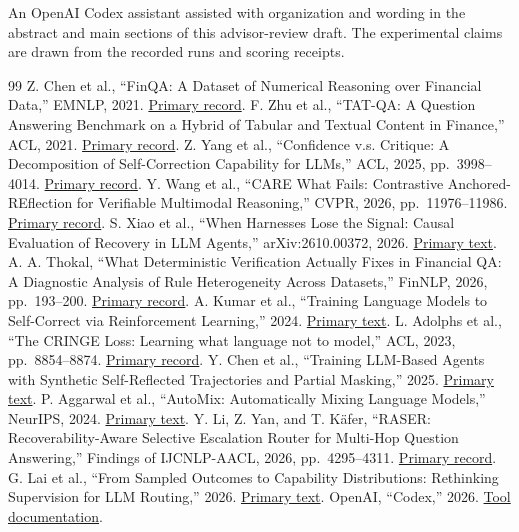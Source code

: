 \documentclass[10pt,letterpaper,conference]{IEEEtran}
\begin{document}
An OpenAI Codex assistant \cite{r13} assisted with organization and wording in the abstract and main sections of this advisor-review draft. The experimental claims are drawn from the recorded runs and scoring receipts.
\begin{thebibliography}{99}
 Z. Chen et al., ``FinQA: A Dataset of Numerical Reasoning over Financial Data,'' EMNLP, 2021. \href{https://aclanthology.org/2021.emnlp-main.300/}{Primary record}.
 F. Zhu et al., ``TAT-QA: A Question Answering Benchmark on a Hybrid of Tabular and Textual Content in Finance,'' ACL, 2021. \href{https://aclanthology.org/2021.acl-long.254/}{Primary record}.
 Z. Yang et al., ``Confidence v.s. Critique: A Decomposition of Self-Correction Capability for LLMs,'' ACL, 2025, pp.~3998--4014. \href{https://aclanthology.org/2025.acl-long.203/}{Primary record}.
 Y. Wang et al., ``CARE What Fails: Contrastive Anchored-REflection for Verifiable Multimodal Reasoning,'' CVPR, 2026, pp.~11976--11986. \href{https://openaccess.thecvf.com/content/CVPR2026/html/Wang_CARE_What_Fails_Contrastive_Anchored-REflection_for_Verifiable_Multimodal_Reasoning_CVPR_2026_paper.html}{Primary record}.
 S. Xiao et al., ``When Harnesses Lose the Signal: Causal Evaluation of Recovery in LLM Agents,'' arXiv:2610.00372, 2026. \href{https://arxiv.org/abs/2610.00372}{Primary text}.
 A. A. Thokal, ``What Deterministic Verification Actually Fixes in Financial QA: A Diagnostic Analysis of Rule Heterogeneity Across Datasets,'' FinNLP, 2026, pp.~193--200. \href{https://aclanthology.org/2026.finnlp-1.16/}{Primary record}.
 A. Kumar et al., ``Training Language Models to Self-Correct via Reinforcement Learning,'' 2024. \href{https://arxiv.org/abs/2409.12917}{Primary text}.
 L. Adolphs et al., ``The CRINGE Loss: Learning what language not to model,'' ACL, 2023, pp.~8854--8874. \href{https://aclanthology.org/2023.acl-long.493/}{Primary record}.
 Y. Chen et al., ``Training LLM-Based Agents with Synthetic Self-Reflected Trajectories and Partial Masking,'' 2025. \href{https://arxiv.org/abs/2505.20023}{Primary text}.
 P. Aggarwal et al., ``AutoMix: Automatically Mixing Language Models,'' NeurIPS, 2024. \href{https://arxiv.org/abs/2310.12963}{Primary text}.
 Y. Li, Z. Yan, and T. Käfer, ``RASER: Recoverability-Aware Selective Escalation Router for Multi-Hop Question Answering,'' Findings of IJCNLP-AACL, 2026, pp.~4295--4311. \href{https://aclanthology.org/2026.findings-aacl.219/}{Primary record}.
 G. Lai et al., ``From Sampled Outcomes to Capability Distributions: Rethinking Supervision for LLM Routing,'' 2026. \href{https://arxiv.org/abs/2606.06924}{Primary text}.
 OpenAI, ``Codex,'' 2026. \href{https://openai.com/codex/}{Tool documentation}.
\end{thebibliography}
\end{document}
